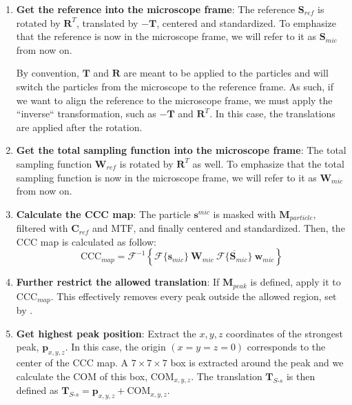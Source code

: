 \begin{enumerate}
    \item \textbf{Get the reference into the microscope frame}: The reference $\bm{S}_{ref}$ is rotated by $\bm{R}^{T}$, translated by $-\bm{T}$, centered and standardized. To emphasize that the reference is now in the microscope frame, we will refer to it as $\bm{S}_{mic}$ from now on.
    \begin{note}\label{note:ref2mic_frame}By convention, $\bm{T}$ and $\bm{R}$ are meant to be applied to the particles and will switch the particles from the microscope to the reference frame. As such, if we want to align the reference to the microscope frame, we must apply the ``inverse`` transformation, such as $-\bm{T}$ and $\bm{R}^{T}$. In this case, the translations are applied after the rotation.
    \end{note}
    
    \item \textbf{Get the total sampling function into the microscope frame}: The total sampling function $\bm{W}_{ref}$ is rotated by $\bm{R}^{T}$ as well. To emphasize that the total sampling function is now in the microscope frame, we will refer to it as $\bm{W}_{mic}$ from now on.
    
    \item \textbf{Calculate the CCC map}: The particle $\bm{s}^{mic}$ is masked with $\bm{M}_{particle}$, filtered with $\bm{C}_{ref}$ and $\bm{\mathrm{MTF}}$, and finally centered and standardized. Then, the CCC map is calculated as follow:
    \begin{equation}
        \bm{\mathrm{CCC}}_{map} = 
        \mathcal{F}^{-1} \left\{
        \mathcal{F} \{ \bm{s}_{mic} \}\
        \bm{W}_{mic}\
        \overline{ \mathcal{F} \{ \bm{S}_{mic} \}} \
        \bm{w}_{mic}
        \right\}
    \end{equation}

    \item \textbf{Further restrict the allowed translation}: If $\bm{M}_{peak}$ is defined, apply it to $\bm{\mathrm{CCC}}_{map}$. This effectively removes every peak outside the allowed region, set by .

    \item \textbf{Get highest peak position}: Extract the $x,y,z$ coordinates of the strongest peak, $\bm{p}_{x,y,z}$. In this case, the origin $(x=y=z=0)$ corresponds to the center of the CCC map. A $7\!\times\!7\!\times\!7$ box is extracted around the peak and we calculate the COM of this box, $\bm{\mathrm{COM}}_{x,y,z}$. The translation $\bm{T}_{S\text{-}s}$ is then defined as $\bm{T}_{S\text{-}s} = \bm{p}_{x,y,z} + \bm{\mathrm{COM}}_{x,y,z}$.
\end{enumerate}

